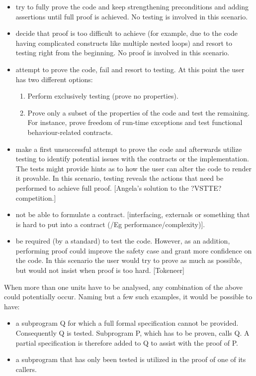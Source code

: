 \documentclass{llncs}
\begin{document}
\begin {itemize}
  \item try to fully prove the code and keep strengthening preconditions
    and adding assertions until full proof is achieved. No testing is
    involved in this scenario.

  \item decide that proof is too difficult to achieve (for example, due
    to the code having complicated constructs like multiple nested
    loops) and resort to testing right from the beginning. No proof
    is involved in this scenario.

  \item attempt to prove the code, fail and resort to testing. At this
    point the user has two different options:

    \begin{enumerate}
      \item Perform exclusively testing (prove no properties).

      \item Prove only a subset of the properties of the code and
        test the remaining. For instance, prove freedom of run-time
        exceptions and test functional behaviour-related contracts.
    \end{enumerate}

  \item make a first unsuccessful attempt to prove the code and afterwards
    utilize testing to identify potential issues with the contracts or
    the implementation. The tests might provide hints as to how the user
    can alter the code to render it provable. In this scenario, testing
    reveals the actions that need be performed to achieve full proof.
    [Angela's solution to the ?VSTTE? competition.]

  \item not be able to formulate a contract. [interfacing, externals or something
    that is hard to put into a contract (/Eg performance/complexity)].

  \item be required (by a standard) to test the code. However, as an addition,
    performing proof could improve the safety case and grant more confidence on the
    code. In this scenario the user would try to prove as much as possible, but would
    not insist when proof is too hard.
    [Tokeneer]
\end{itemize}

When more than one units have to be analysed, any combination of the above could
potentially occur. Naming but a few such examples, it would be possible to have:
\begin{itemize}
  \item a subprogram Q for which a full formal specification cannot be provided.
    Consequently Q is tested. Subprogram P, which has to be proven, calls Q.
    A partial specification is therefore added to Q to assist with the proof of P.

  \item a subprogram that has only been tested is utilized in the proof of one of its
    callers.
\end{itemize}
\end{document}
